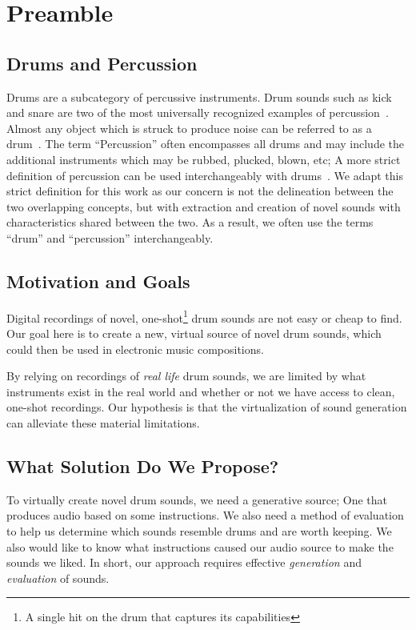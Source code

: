 \documentclass[runningheads,a4paper]{llncs}
\begin{document}
\section{Preamble}
\subsection{Drums and Percussion}
Drums are a subcategory of percussive instruments. Drum sounds such as kick and snare are two of the most universally recognized examples of percussion~\cite{barry2005drum}. Almost any object which is struck to produce noise can be referred to as a drum~\cite{latham2002oxford}. The term \enquote{Percussion} often encompasses all drums and may include the additional instruments which may be rubbed, plucked, blown, etc; A more strict definition of percussion can be used interchangeably with drums~\cite{latham2002oxford}. We adapt this strict definition for this work as our concern is not the delineation between the two overlapping concepts, but with extraction and creation of novel sounds with characteristics shared between the two. As a result, we often use the terms \enquote{drum} and \enquote{percussion} interchangeably.

\subsection{Motivation and Goals}
Digital recordings of novel, one-shot\footnote{A single hit on the drum that captures its capabilities} drum sounds are not easy or cheap to find. Our goal here is to create a new, virtual source of novel drum sounds, which could then be used in electronic music compositions.

By relying on recordings of \textit{real life} drum sounds, we are limited by what instruments exist in the real world and whether or not we have access to clean, one-shot recordings. Our hypothesis is that the virtualization of sound generation can alleviate these material limitations. 

\subsection{What Solution Do We Propose?}
To virtually create novel drum sounds, we need a generative source; One that produces audio based on some instructions. We also need a method of evaluation to help us determine which sounds resemble drums and are worth keeping. We also would like to know what instructions caused our audio source to make the sounds we liked. In short, our approach requires effective \textit{generation} and \textit{evaluation} of sounds. 
\end{document}
